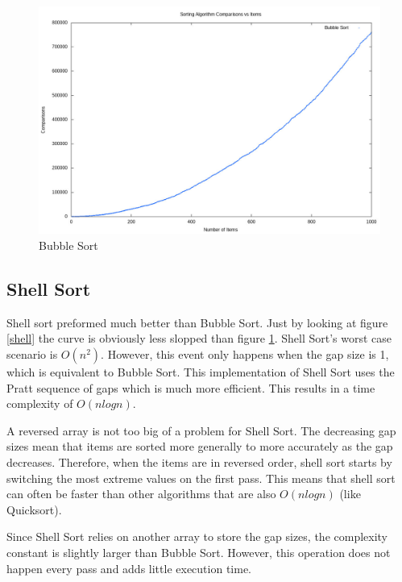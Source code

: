 \documentclass[12pt]{article}
\begin{document}
	\begin{figure}[H]
		\caption{Bubble Sort}\label{bubble}
		\includegraphics[width=6in]{bubble}
		\centering
	\end{figure}


	\subsection{Shell Sort}

	Shell sort preformed much better than Bubble Sort.
	Just by looking at figure \ref{shell} the curve is obviously less slopped than figure \ref{bubble}.
	Shell Sort's worst case scenario is $O(n^2)$.
	However, this event  only happens when the gap size is 1, which is equivalent to Bubble Sort.
	This implementation of Shell Sort uses the Pratt sequence of gaps which is much more efficient.
	This results in a time complexity of $O(n log n)$.

	A reversed array is not too big of a problem for Shell Sort.
	The decreasing gap sizes mean that items are sorted more generally to more accurately as the gap decreases.
	Therefore, when the items are in reversed order, shell sort starts by switching the most extreme values on the first pass.
	This means that shell sort can often be faster than other algorithms that are also $O(n log n)$ (like Quicksort).

	Since Shell Sort relies on another array to store the gap sizes, the complexity constant is slightly larger than Bubble Sort.
	However, this operation does not happen every pass and adds little execution time.
\end{document}
